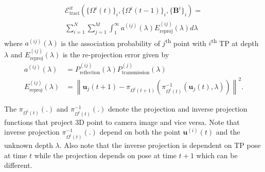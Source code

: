 \documentclass[10pt,twocolumn,letterpaper]{article}
\newcommand{\pos}[2]{\mathbf{p}^{(#1)}(#2)}
\newcommand{\relp}[2]{\Omega^{#1}(#2)}
\newcommand{\trackp}[1]{\mathbf{u}^{(i)}(#1)}
\newcommand{\trackpj}[1]{\mathbf{u}_j(#1)}
\newcommand{\dimsn}[1]{\mathbf{B}^{#1}}
\newcommand{\projectionOf}[1]{\pi_{\relp{i}{t}}\left(#1\right)}
\newcommand{\projectionOft}[1]{\pi_{\relp{i}{t+1}}\left(#1\right)}
\newcommand{\Energy}[1]{\mathcal{E}^{it}_{\text{#1}}}
\newcommand{\invProjectionOf}[1]{\pi^{-1}_{\relp{i}{t}}\left(#1\right)}
\newcommand{\occf}{f^i_{occ}(\mathbf{x}_j)}
\newcommand{\lambdadist}{f_{\lambda}(\trackpj{t-1}, \lambda)}
\newcommand{\assocP}{a^{(ij)}(\lambda)}
\newcommand{\Ereproj}{E^{(ij)}_{\text{reproj}}}
\newcommand{\Ptrans}{P^{(j)}_{\text{transmission}}(\lambda)}
\newcommand{\Prefl}{P^{(ij)}_{\text{reflection}}(\lambda)}
\begin{document}
\begin{multline}
  \Energy{traci}(\{ \relp{i}{t} \}_i, \{ \relp{i}{t-1} \}_i, \{\dimsn{i}\}_i ) = \\
    \sum_{i=1}^{N} 
    \sum_{j = 1}^{M}
    \int_1^\infty \assocP\Ereproj(\lambda) d\lambda
\end{multline}
where $\assocP$ is the association probability of
$j$\textsuperscript{th} point with $i$\textsuperscript{th} TP at depth $\lambda$
and $\Ereproj(\lambda)$ is the re-projection error given by
%
\begin{align}
  \assocP &= \Prefl\Ptrans\\
  \Ereproj(\lambda) &= \left\|\trackpj{t+1} - \projectionOft{\invProjectionOf{\trackpj{t}, \lambda}}\right\|^2 .
  \label{eq:reprojerror}
\end{align}

The  $\projectionOf{.}$ and $\invProjectionOf{.}$ denote the projection and
inverse projection functions that project 3D point to camera image and vice
versa. Note that inverse projection $\invProjectionOf{.}$ depend on both the
point $\trackp{t}$ and the unknown depth $\lambda$. Also note that the inverse projection is dependent on TP pose at time $t$ while the projection depends on pose at time $t+1$ which can be different.

\end{document}
